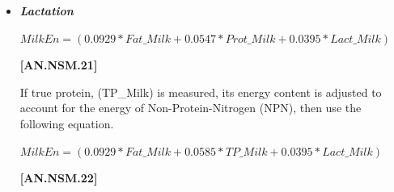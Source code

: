 \begin{refsection}
\begin{itemize}
            {\raggedleft \textbf{[AN.NSM.18]}\par}
\vspace{0.2cm}

\textit{\small During Involution}
\vspace{0.2cm}

\begin{center}
    \(MEpreg = (2 * 0.00159 * DOP - 0.0352) * \frac{CBW}{45} * 0.14, if DOP > 190.0\)
\end{center}
\vspace{0.5cm}

            {\raggedleft \textbf{[AN.NSM.19]}\par}
\vspace{0.2cm}

\textbf{Otherwise}
\vspace{0.25cm}

\begin{center}
    \(NEpreg = MEpreg * 0.64\)
\end{center}
\vspace{0.5cm}

            {\raggedleft \textbf{[AN.NSM.20]}\par}
\vspace{0.2cm}

        \item \textbf{\textit{Lactation}}
\vspace{0.2cm}

\begin{center}
    \(MilkEn = (0.0929 * Fat\_Milk + 0.0547 * Prot\_Milk + 0.0395 * Lact\_Milk)\)
\end{center}

\vspace{0.5cm}
            {\raggedleft \textbf{[AN.NSM.21]}\par}

\vspace{0.2cm}

If true protein, (TP\_Milk) is measured, its energy content is adjusted to account for the energy of Non-Protein-Nitrogen (NPN), then use the following equation. 
\vspace{0.2cm}

\begin{center}
    \(MilkEn = (0.0929 * Fat\_Milk + 0.0585 * TP\_Milk + 0.0395 * Lact\_Milk)\)
\end{center}

\vspace{0.5cm}
            {\raggedleft \textbf{[AN.NSM.22]}\par}


\end{itemize}
\end{refsection}
